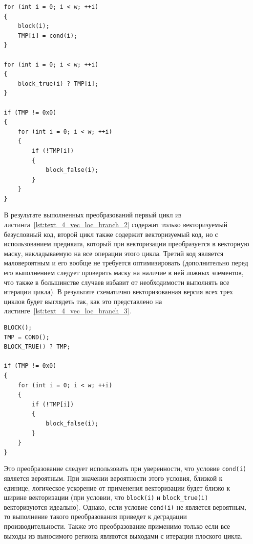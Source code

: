 \begin{lstlisting}[caption={Расщепление плоского цикла с маловероятным регионом.},label={lst:text_4_vec_loc_branch_2}]
for (int i = 0; i < w; ++i)
{
    block(i);
    TMP[i] = cond(i);
}

for (int i = 0; i < w; ++i)
{
    block_true(i) ? TMP[i];
}

if (TMP != 0x0)
{
    for (int i = 0; i < w; ++i)
    {
        if (!TMP[i])
        {
            block_false(i);
        }
    }
}
\end{lstlisting}

В результате выполненных преобразований первый цикл из листинга~\ref{lst:text_4_vec_loc_branch_2} содержит только векторизуемый безусловный код, второй цикл также содержит векторизуемый код, но с использованием предиката, который при векторизации преобразуется в векторную маску, накладываемую на все операции этого цикла.
Третий код является маловероятным и его вообще не требуется оптимизировать (дополнительно перед его выполнением следует проверить маску на наличие в ней ложных элементов, что также в большинстве случаев избавит от необходимости выполнять все итерации цикла).
В результате схематично векторизованная версия всех трех циклов будет выглядеть так, как это представлено на листинге~\ref{lst:text_4_vec_loc_branch_3}.

\begin{singlespace}
\begin{lstlisting}[caption={Векторизованная версия расщепленного плоского цикла с маловероятным регионом.},label={lst:text_4_vec_loc_branch_3}]
BLOCK();
TMP = COND();
BLOCK_TRUE() ? TMP;

if (TMP != 0x0)
{
    for (int i = 0; i < w; ++i)
    {
        if (!TMP[i])
        {
            block_false(i);
        }
    }
}
\end{lstlisting}
\end{singlespace}

Это преобразование следует использовать при уверенности, что условие \texttt{cond(i)} является вероятным.
При значении вероятности этого условия, близкой к единице, логическое ускорение от применения векторизации будет близко к ширине векторизации (при условии, что \texttt{block(i)} и \texttt{block\_true(i)} векторизуются идеально).
Однако, если условие \texttt{cond(i)} не является вероятным, то выполнение такого преобразования приведет к деградации производительности.
Также это преобразование применимо только если все выходы из выносимого региона являются выходами с итерации плоского цикла.

